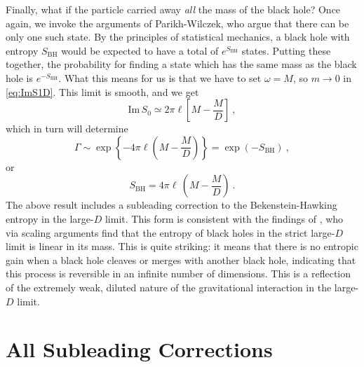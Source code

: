 \documentclass[a4paper,11pt]{article}
\newcommand{\im}{\text{Im} \,}
\begin{document}
Finally, what if the particle carried away \emph{all} the mass of the black hole? Once again, we invoke the arguments of Parikh-Wilczek, who argue that there can be only one such state. By the principles of statistical mechanics, a black hole with entropy $S_{\text{BH}}$ would be expected to have a total of $e^{S_{\text{BH}}}$ states. Putting these together, the probability for finding a state which has the same mass as the black hole is $e^{-S_{\text{BH}}}$. What this means for us is that we have to set $\omega = M$, so $m \rightarrow 0$ in \eqref{eq:ImS1D}. This limit is smooth, and we get
\begin{equation}
\im S_0 \simeq 2\pi\ell \left[ M - \frac{M}{D} \right] \ ,
\end{equation}
which in turn will determine
\begin{equation}
\Gamma \sim \exp \left\lbrace -4\pi\ell \left( M - \frac{M}{D} \right) \right\rbrace = \exp (-S_{\text{BH}}) \ ,
\end{equation}
or
\begin{equation}
S_{\text{BH}} = 4\pi\ell \, \left( M - \frac{M}{D} \right) \ .
\end{equation}
The above result includes a subleading correction to the Bekenstein-Hawking entropy in the large-$D$ limit. This form is consistent with the findings of \cite{Emparan:2013moa}, who via scaling arguments find that the entropy of black holes in the strict large-$D$ limit is linear in its mass. This is quite striking: it means that there is no entropic gain when a black hole cleaves or merges with another black hole, indicating that this process is reversible in an infinite number of dimensions. This is a reflection of the extremely weak, diluted nature of the gravitational interaction in the large-$D$ limit.

\section{All Subleading Corrections}
\label{sec:kSubLead}
\end{document}

